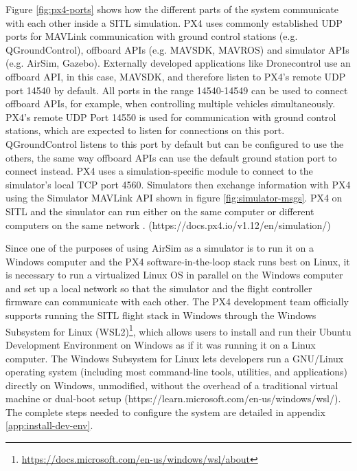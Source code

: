 Figure \ref{fig:px4-ports} shows how the different parts of the system communicate with each other inside a SITL simulation.
PX4 uses commonly established UDP ports for MAVLink communication with ground control stations (e.g. QGroundControl), offboard APIs (e.g. MAVSDK, MAVROS) and simulator APIs (e.g. AirSim, Gazebo).
Externally developed applications like Dronecontrol use an offboard API, in this case, MAVSDK, and therefore listen to PX4's remote UDP port 14540 by default.
All ports in the range 14540-14549 can be used to connect offboard APIs, for example, when controlling multiple vehicles simultaneously.
PX4's remote UDP Port 14550 is used for communication with ground control stations, which are expected to listen for connections on this port. QGroundControl listens to this port by default but can be configured to use the others, the same way offboard APIs can use the default ground station port to connect instead.
PX4 uses a simulation-specific module to connect to the simulator's local TCP port 4560.
Simulators then exchange information with PX4 using the Simulator MAVLink API shown in figure \ref{fig:simulator-msgs}. 
PX4 on SITL and the simulator can run either on the same computer or different computers on the same network \cite{px4-simulation}. (https://docs.px4.io/v1.12/en/simulation/)
\todo

Since one of the purposes of using AirSim as a simulator is to run it on a Windows computer and the PX4 software-in-the-loop stack runs best on Linux, it is necessary to run a virtualized Linux OS in parallel on the Windows computer and set up a local network so that the simulator and the flight controller firmware can communicate with each other.
The PX4 development team officially supports running the SITL flight stack in Windows through the Windows Subsystem for Linux (WSL2)\footnote{\url{https://docs.microsoft.com/en-us/windows/wsl/about}}, which allows users to install and run their Ubuntu Development Environment on Windows as if it was running it on a Linux computer.
The Windows Subsystem for Linux lets developers run a GNU/Linux operating system (including most command-line tools, utilities, and applications) directly on Windows, unmodified, without the overhead of a traditional virtual machine or dual-boot setup \cite{wsl-learn} (https://learn.microsoft.com/en-us/windows/wsl/).
The complete steps needed to configure the system are detailed in appendix \ref{app:install-dev-env}.
\todo

